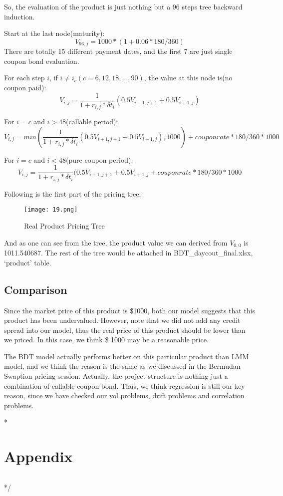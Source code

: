 \documentclass[paper = letterpaper, fontsize=12pt]{article}
\begin{document}
So, the evaluation of the product is just nothing but a 96 steps tree backward induction. 

Start at the last node(maturity):
\[
	V_{96, j} = 1000*(1  + 0.06*180/360)
\]
There are totally 15 different payment dates, and the first 7 are just single coupon bond evaluation. 

For each step $i$, if $i \neq i_c(c = 6, 12, 18, …, 90)$, the value at this node is(no coupon paid):
\[
	V_{i, j} = \frac{1}{1+r_{i, j}*\delta t_i} (0.5 V_{i+1, j+1} + 0.5 V_{i+1, j})
\]

For $i = c$ and $i > 48$(callable period):
\[
	V_{i, j} =min( \frac{1}{1+r_{i, j}*\delta t_i} (0.5 V_{i+1, j+1} + 0.5 V_{i+1, j}), 1000) + coupon rate*180/360*1000
\]

For $i = c$ and $i < 48$(pure coupon period):
\[
	V_{i, j} = \frac{1}{1+r_{i, j}*\delta t_i} (0.5 V_{i+1, j+1} + 0.5 V_{i+1, j}+ coupon rate*180/360*1000
\]

Following is the first part of the pricing tree:
\begin{figure}[H]
    \centering
    \texttt{[image: 19.png]}
    \caption{Real Product Pricing Tree}
\end{figure}
And as one can see from the tree, the product value we can derived from $V_{0,0}$ is 1011.540687. The rest of the tree would be attached in BDT\_daycout\_final.xlsx, ‘product’ table.

\subsection{Comparison}
Since the market price of this product is \$1000, both our model suggests that this product has been undervalued. However, note that we did not add any credit spread into our model, thus the real price of this product should be lower than we priced. In this case, we think \$ 1000 may be a reasonable price.

The BDT model actually performs better on this particular product than LMM model, and we think the reason is the same as we discussed in the Bermudan Swaption pricing session. Actually, the project structure is nothing just a combination of callable coupon bond. Thus, we think regression is still our key reason, since we have checked our vol problems, drift problems and correlation problems.





\/* 
\section{Appendix}
\label{sec:r}
\begin{lstlisting}

\end{lstlisting}

\begin{python}
\end{python}
*/

\newpage


\end{document}
